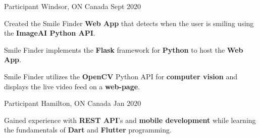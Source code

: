 

\begin{cventries}

  \cventry
    {Participant} %
    {\href{https://github.com/MattBelanger321/SmileFinder}{}} %
    {Windsor, ON Canada} %
    {Sept 2020} %
    {
      \begin{cvitems} %
        \item {Created the Smile Finder \textbf{Web App} that detects when the user is smiling using the \textbf{ImageAI Python API}.}
        \item {Smile Finder implements the \textbf{Flask} framework for \textbf{Python} to host the \textbf{Web App}.}
        \item {Smile Finder utilizes the \textbf{OpenCV} Python API for \textbf{computer vision} and displays the live video feed on a \textbf{web-page}.}
      \end{cvitems}
    }

  \cventry
    {Participant} %
    {\href{https://github.com/DeltaHacksVIUWindsor}{}} %
    {Hamilton, ON Canada} %
    {Jan 2020} %
    {
      \begin{cvitems} %
        \item {Gained experience with \textbf{REST API}'s and \textbf{mobile development} while learning the fundamentals of \textbf{Dart} and \textbf{Flutter} programming.}
      \end{cvitems}
    }
\end{cventries}
